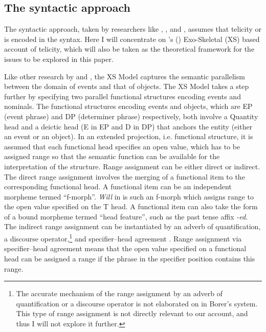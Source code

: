 \documentclass[output=paper]{langsci/langscibook}
\begin{document}
\subsection{The syntactic approach}

The syntactic approach, taken by researchers like
\textcite{Borer2005a,Borer2005b}, \textcite{MacDonald2008}, and
\textcite{travis2010inner}, assumes that telicity or  is encoded in
the syntax. Here I will concentrate on \citeauthor{Borer2005b}'s
(\citeyear{Borer2005a,Borer2005b}) Exo-Skeletal (XS) based account of
telicity, which will also be taken as the theoretical framework for the issues
to be explored in this paper.

Like other research by \textcite{bach1986algebra} and
\textcite{Rothstein2004}, the XS Model
captures the semantic parallelism between the domain of events and that of
objects. The XS Model takes a step further by specifying two parallel
functional structures encoding events and nominals. The functional structures
encoding events and objects, which are EP (event phrase) and DP (determiner
phrase) respectively, both involve a Quantity head and a deictic head (E in EP
and D in DP) that anchors the entity (either an event or an object). In an
extended projection, i.e. functional structure, it is assumed that each
functional head specifies an open value, which has to be assigned range so that
the semantic function can be available for the interpretation of the structure.
Range assignment can be either direct or indirect. The direct range assignment
involves the merging of a functional item to the corresponding functional head.
A functional item can be an independent morpheme termed \enquote{f-morph}.
\emph{Will} in  is such an f-morph which assigns range to the open value
specified on the T head. A functional item can also take the form of a bound
morpheme termed \enquote{head feature}, such as the  past tense affix
\emph{-ed}.  The indirect range assignment can be instantiated by an adverb of
quantification, a discourse operator,\footnote{The accurate mechanism of the
    range assignment by an adverb of quantification or a discourse operator is
not elaborated on in Borer’s system. This type of range assignment is not
directly relevant to our account, and thus I will not explore it further.} and
specifier--head agreement \citep[18]{Borer2005b}. Range assignment via
specifier--head agreement means that the open value specified on a functional
head can be assigned a range if the phrase in the specifier position contains
this range.
\end{document}
